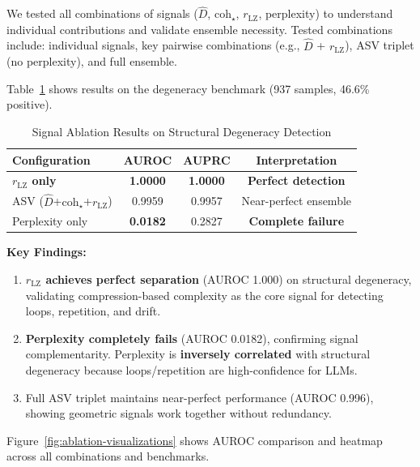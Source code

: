 \documentclass[11pt]{article}
\begin{document}
We tested all combinations of signals ($\hat{D}$, $\mathrm{coh}_\star$, $r_{\text{LZ}}$, perplexity) to understand individual contributions and validate ensemble necessity. Tested combinations include: individual signals, key pairwise combinations (e.g., $\hat{D}$ + $r_{\text{LZ}}$), ASV triplet (no perplexity), and full ensemble.

Table~\ref{tab:ablation-results} shows results on the degeneracy benchmark (937 samples, 46.6\% positive).

\begin{table}[h]
\centering
\caption{Signal Ablation Results on Structural Degeneracy Detection}
\label{tab:ablation-results}
\begin{tabular}{lccc}
\toprule
\textbf{Configuration} & \textbf{AUROC} & \textbf{AUPRC} & \textbf{Interpretation} \\
\midrule
\textbf{$r_{\text{LZ}}$ only} & \textbf{1.0000} & \textbf{1.0000} & \textbf{Perfect detection} \\
ASV ($\hat{D}$+$\mathrm{coh}_\star$+$r_{\text{LZ}}$) & 0.9959 & 0.9957 & Near-perfect ensemble \\
Perplexity only & \textbf{0.0182} & 0.2827 & \textbf{Complete failure} \\
\bottomrule
\end{tabular}
\end{table}

\textbf{Key Findings:}
\begin{enumerate}
\item \textbf{$r_{\text{LZ}}$ achieves perfect separation} (AUROC 1.000) on structural degeneracy, validating compression-based complexity as the core signal for detecting loops, repetition, and drift.
\item \textbf{Perplexity completely fails} (AUROC 0.0182), confirming signal complementarity. Perplexity is \textbf{inversely correlated} with structural degeneracy because loops/repetition are high-confidence for LLMs.
\item Full ASV triplet maintains near-perfect performance (AUROC 0.996), showing geometric signals work together without redundancy.
\end{enumerate}

Figure~\ref{fig:ablation-visualizations} shows AUROC comparison and heatmap across all combinations and benchmarks.
\end{document}
